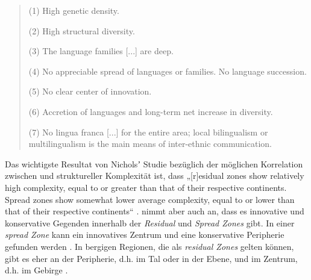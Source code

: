 \begin{quote}



(1) High genetic density.


(2) High structural diversity.


(3) The language families [...] are deep.


(4) No appreciable spread of languages or families. No language succession.


(5) No clear center of innovation.


(6) Accretion of languages and long-term net increase in diversity.


(7) No lingua franca [...] for the entire area; local bilingualism or multilingualism is the main means of inter-ethnic communication.

\citep[21]{Nichols1992}
\end{quote}

Das wichtigste Resultat von Nicholsʼ Studie bezüglich der möglichen Korrelation zwischen  und struktureller Komplexität ist, dass „[r]esidual zones show relatively high complexity, equal to or greater than that of their respective continents. Spread zones show somewhat lower average complexity, equal to or lower than that of their respective continents“ \citep[192]{Nichols1992}. \citet{Nichols1992} nimmt aber auch an, dass es innovative und konservative Gegenden innerhalb der \textit{Residual} und \textit{Spread Zones} gibt. In einer \textit{spread Zone} kann ein innovatives Zentrum und eine konservative Peripherie gefunden werden \citep[17]{Nichols1992}. In bergigen Regionen, die als \textit{residual Zones} gelten können, gibt es  eher an der Peripherie, d.h. im Tal oder in der Ebene, und  im Zentrum, d.h. im Gebirge \citep[14]{Nichols1992}.


